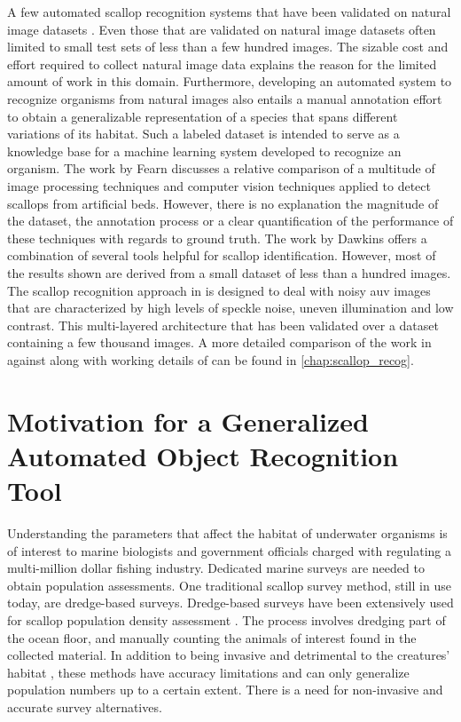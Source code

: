 \documentclass {udthesis}
\begin{document}
A few automated scallop recognition systems that have been validated on natural image datasets \cite{dawkings13,guomundsson,fearn, prasanna_med, prasanna_aslo, prasanna_igi}. Even those that are validated on natural image datasets often limited to small test sets of less than a few hundred images. The sizable cost and effort required to collect natural image data explains the reason for the limited amount of work in this domain. Furthermore, developing an automated system to recognize organisms from natural images also entails a manual annotation effort to obtain a generalizable representation of a species that spans different variations of its habitat. Such a labeled dataset is intended to serve as a knowledge base for a machine learning system developed to recognize an organism. The work by Fearn \cite{fearn} discusses a relative comparison of a multitude of image processing techniques and computer vision techniques applied to detect scallops from artificial beds. However, there is no explanation the 
magnitude of the dataset, the annotation process or a clear quantification of the performance of these techniques with regards to ground truth.  The work by Dawkins \cite{dawkings13} offers a combination of several tools helpful for scallop identification. However, most of the results shown are derived from a small dataset of less than a hundred images. The scallop recognition approach in \cite{prasanna_med, prasanna_aslo, prasanna_igi} is designed to deal with noisy \gls{auv} images that are characterized by high levels of speckle noise, uneven illumination and low contrast. This multi-layered architecture that has been validated over a dataset containing a few thousand images. A more detailed comparison of the work in \cite{dawkings13} against \cite{prasanna_igi} along with working details of \cite{prasanna_igi} can be found in \ref{chap:scallop_recog}.


\section{Motivation for a Generalized Automated Object Recognition Tool}

Understanding the parameters that affect the habitat of underwater organisms is of interest to marine
biologists and government officials charged with regulating a multi-million dollar fishing industry. Dedicated
marine surveys are needed to obtain population assessments. One traditional scallop survey method, still
in use today,  are dredge-based surveys. Dredge-based surveys have been extensively used for scallop population density
assessment \cite{nefsc}. The process involves dredging part of the ocean floor, and manually counting the
animals of interest found in the collected material. In addition to being invasive and
detrimental to the creatures’ habitat \cite{jenkins}, these methods have accuracy
limitations and can only generalize population numbers up to a certain extent.
There is a need for non-invasive and accurate survey alternatives.
\end{document}
